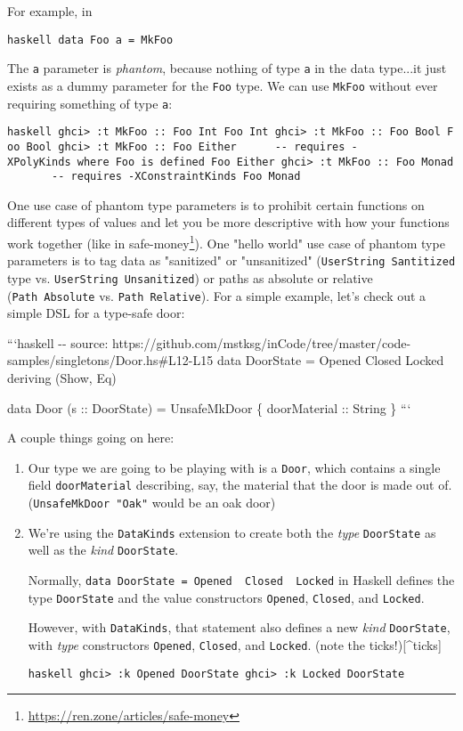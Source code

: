 \documentclass[]{article}
\renewcommand{\href}[2]{#2\footnote{\url{#1}}}
\begin{document}
For example, in

\texttt{haskell\ data\ Foo\ a\ =\ MkFoo}

The \texttt{a} parameter is \emph{phantom}, because nothing of type \texttt{a}
in the data type...it just exists as a dummy parameter for the \texttt{Foo}
type. We can use \texttt{MkFoo} without ever requiring something of type
\texttt{a}:

\texttt{haskell\ ghci\textgreater{}\ :t\ MkFoo\ ::\ Foo\ Int\ Foo\ Int\ ghci\textgreater{}\ :t\ MkFoo\ ::\ Foo\ Bool\ Foo\ Bool\ ghci\textgreater{}\ :t\ MkFoo\ ::\ Foo\ Either\ \ \ \ \ \ -\/-\ requires\ -XPolyKinds\ where\ \textquotesingle{}Foo\textquotesingle{}\ is\ defined\ Foo\ Either\ ghci\textgreater{}\ :t\ MkFoo\ ::\ Foo\ Monad\ \ \ \ \ \ \ -\/-\ requires\ -XConstraintKinds\ Foo\ Monad}

One use case of phantom type parameters is to prohibit certain functions on
different types of values and let you be more descriptive with how your
functions work together (like in
\href{https://ren.zone/articles/safe-money}{safe-money}). One "hello world" use
case of phantom type parameters is to tag data as "sanitized" or "unsanitized"
(\texttt{UserString\ \textquotesingle{}Santitized} type vs.
\texttt{UserString\ \textquotesingle{}Unsanitized}) or paths as absolute or
relative (\texttt{Path\ \textquotesingle{}Absolute} vs.
\texttt{Path\ \textquotesingle{}Relative}). For a simple example, let's check
out a simple DSL for a type-safe door:

```haskell -\/- source:
https://github.com/mstksg/inCode/tree/master/code-samples/singletons/Door.hs\#L12-L15
data DoorState = Opened \textbar{} Closed \textbar{} Locked deriving (Show, Eq)

data Door (s :: DoorState) = UnsafeMkDoor \{ doorMaterial :: String \} ```

A couple things going on here:

\begin{enumerate}
\item
  Our type we are going to be playing with is a \texttt{Door}, which contains a
  single field \texttt{doorMaterial} describing, say, the material that the door
  is made out of. (\texttt{UnsafeMkDoor\ "Oak"} would be an oak door)
\item
  We're using the \texttt{DataKinds} extension to create both the \emph{type}
  \texttt{DoorState} as well as the \emph{kind} \texttt{DoorState}.

  Normally,
  \texttt{data\ DoorState\ =\ Opened\ \textbar{}\ Closed\ \textbar{}\ Locked} in
  Haskell defines the type \texttt{DoorState} and the value constructors
  \texttt{Opened}, \texttt{Closed}, and \texttt{Locked}.

  However, with \texttt{DataKinds}, that statement also defines a new
  \emph{kind} \texttt{DoorState}, with \emph{type} constructors
  \texttt{\textquotesingle{}Opened}, \texttt{\textquotesingle{}Closed}, and
  \texttt{\textquotesingle{}Locked}. (note the \texttt{\textquotesingle{}}
  ticks!){[}\^{}ticks{]}

  \texttt{haskell\ ghci\textgreater{}\ :k\ \textquotesingle{}Opened\ DoorState\ ghci\textgreater{}\ :k\ \textquotesingle{}Locked\ DoorState}
\end{enumerate}
\end{document}
